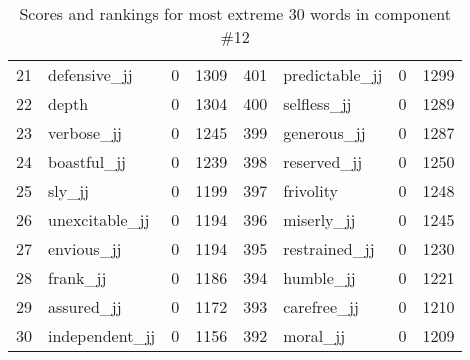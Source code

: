 \begin{table}[tbp]
\begin{tabular}{| rlr@{.}l | rlr@{.}l |}
    21 & defensive\_jj & 0 & 1309    &    401 & predictable\_jj & 0 & 1299 \\
    22 & depth & 0 & 1304    &    400 & selfless\_jj & 0 & 1289 \\
    23 & verbose\_jj & 0 & 1245    &    399 & generous\_jj & 0 & 1287 \\
    24 & boastful\_jj & 0 & 1239    &    398 & reserved\_jj & 0 & 1250 \\
    25 & sly\_jj & 0 & 1199    &    397 & frivolity & 0 & 1248 \\
    26 & unexcitable\_jj & 0 & 1194    &    396 & miserly\_jj & 0 & 1245 \\
    27 & envious\_jj & 0 & 1194    &    395 & restrained\_jj & 0 & 1230 \\
    28 & frank\_jj & 0 & 1186    &    394 & humble\_jj & 0 & 1221 \\
    29 & assured\_jj & 0 & 1172    &    393 & carefree\_jj & 0 & 1210 \\
    30 & independent\_jj & 0 & 1156    &    392 & moral\_jj & 0 & 1209 \\
    \hline
    \end{tabular}
    \caption{Scores and rankings for most extreme 30 words in component \#12} 
\end{table}
\clearpage

